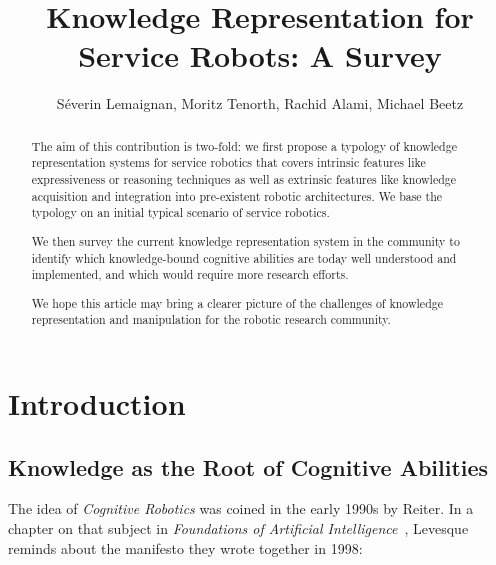 \documentclass[journal]{IEEEtran}
\title{Knowledge Representation for Service Robots: A Survey}
\author{Séverin Lemaignan, Moritz Tenorth, Rachid Alami, Michael Beetz}
\begin{document}
\maketitle


\begin{abstract}

The aim of this contribution is two-fold: we first propose a typology of
knowledge representation systems for service robotics that covers intrinsic
features like expressiveness or reasoning techniques as well as extrinsic
features like knowledge acquisition and integration into pre-existent robotic
architectures. We base the typology on an initial typical scenario of service
robotics.

We then survey the current knowledge representation system in the community to
identify which knowledge-bound cognitive abilities are today well understood
and implemented, and which would require more research efforts.

We hope this article may bring a clearer picture of the challenges of knowledge
representation and manipulation for the robotic research community.

\end{abstract}



\section{Introduction}
\label{sect|intro}

\subsection{Knowledge as the Root of Cognitive Abilities}
\label{sect|cognitive-abilities}

The idea of \emph{Cognitive Robotics} was coined in the early 1990s by Reiter.
In a chapter on that subject in \emph{Foundations of Artificial
Intelligence}~\cite{Levesque2008}, Levesque reminds about the manifesto they
wrote together in 1998:
\end{document}
